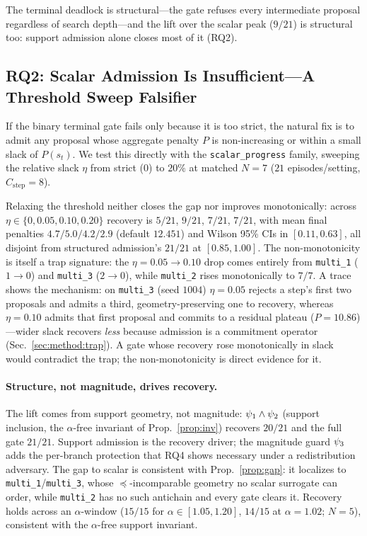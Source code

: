 The terminal deadlock is structural---the gate refuses every intermediate proposal regardless of search depth---and the lift over the scalar peak ($9/21$) is structural too: support admission alone closes most of it (RQ2).

\subsection{RQ2: Scalar Admission Is Insufficient---A Threshold Sweep Falsifier}
\label{sec:eval:rq2}

If the binary terminal gate fails only because it is too strict, the natural fix is to admit any proposal whose aggregate penalty $P$ is non-increasing or within a small slack of $P(s_t)$. We test this directly with the \texttt{scalar\_progress} family, sweeping the relative slack $\eta$ from strict ($0$) to $20\%$ at matched $N{=}7$ ($21$ episodes/setting, $C_{\text{step}}{=}8$).

Relaxing the threshold neither closes the gap nor improves monotonically: across $\eta\in\{0,0.05,0.10,0.20\}$ recovery is $5/21$, $9/21$, $7/21$, $7/21$, with mean final penalties $4.7/5.0/4.2/2.9$ (default $12.451$) and Wilson 95\% CIs in $[0.11,0.63]$, all disjoint from structured admission's $21/21$ at $[0.85,1.00]$. The non-monotonicity is itself a trap signature: the $\eta{=}0.05\!\to\!0.10$ drop comes entirely from \texttt{multi\_1} ($1\!\to\!0$) and \texttt{multi\_3} ($2\!\to\!0$), while \texttt{multi\_2} rises monotonically to $7/7$. A trace shows the mechanism: on \texttt{multi\_3} (seed $1004$) $\eta{=}0.05$ rejects a step's first two proposals and admits a third, geometry-preserving one to recovery, whereas $\eta{=}0.10$ admits that first proposal and commits to a residual plateau ($P{=}10.86$)---wider slack recovers \emph{less} because admission is a commitment operator (Sec.~\ref{sec:method:trap}). A gate whose recovery rose monotonically in slack would contradict the trap; the non-monotonicity is direct evidence for it.

\paragraph{Structure, not magnitude, drives recovery.}
The lift comes from support geometry, not magnitude: $\psi_1\wedge\psi_2$ (support inclusion, the $\alpha$-free invariant of Prop.~\ref{prop:inv}) recovers $20/21$ and the full gate $21/21$. Support admission is the recovery driver; the magnitude guard $\psi_3$ adds the per-branch protection that RQ4 shows necessary under a redistribution adversary. The gap to scalar is consistent with Prop.~\ref{prop:gap}: it localizes to \texttt{multi\_1}/\texttt{multi\_3}, whose $\preceq$-incomparable geometry no scalar surrogate can order, while \texttt{multi\_2} has no such antichain and every gate clears it. Recovery holds across an $\alpha$-window ($15/15$ for $\alpha\in[1.05,1.20]$, $14/15$ at $\alpha{=}1.02$; $N{=}5$), consistent with the $\alpha$-free support invariant.

